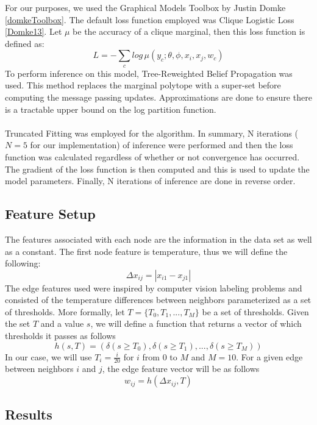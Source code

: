 For our purposes, we used the Graphical Models Toolbox by Justin Domke \ref{domkeToolbox}. The default loss function employed was Clique Logistic Loss \ref{Domke13}.  Let $\mu$ be the accuracy of a clique marginal, then this loss function is defined as:
\[
L = - \sum_c {log \, \mu(y_c; \theta, \phi, x_i, x_j, w_c)}
\]
To perform inference on this model, Tree-Reweighted Belief Propagation was used. This method replaces the marginal polytope with a super-set before computing the message passing updates. Approximations are done to ensure there is a tractable upper bound on the log partition function. \\
\\
Truncated Fitting was employed for the algorithm. In summary, N iterations ($N=5$ for our implementation) of inference were performed and then the loss function was calculated regardless of whether or not convergence has occurred. The gradient of the loss function is then computed and this is used to update the model parameters. Finally, N iterations of inference are done in reverse order. 

\subsection{Feature Setup}

The features associated with each node are the information in the data set as well as a constant. The first node feature is temperature, thus we will define the following:
\[
\Delta x_{ij} = |x_{i1} - x_{j1}|
\]
The edge features used were inspired by computer vision labeling problems and consisted of the temperature differences between neighbors parameterized as a set of thresholds. More formally, let $T = \{ T_0 , T_1, ..., T_M \}$ be a set of thresholds. Given the set $T$ and a value $s$, we will define a function that returns a vector of which thresholds it passes as follows
\[
h(s,T) = ( \delta (s \geq T_0), \delta (s \geq T_1), ..., \delta (s \geq T_M))
\]
In our case, we will use $T_i = \frac{i}{20}$ for $i$ from $0$ to $M$ and $M=10$. For a given edge between neighbors $i$ and $j$, the edge feature vector will be as follows
\[
w_{ij} = h( \Delta x_{ij}, T)
\] 

\subsection{Results}

